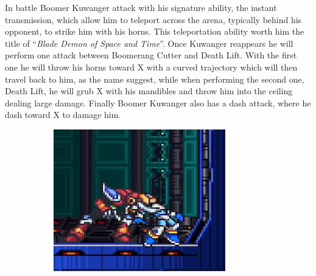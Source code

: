 In battle Boomer Kuwanger attack with his signature ability, the instant transmission, which allow him to teleport across the arena, typically behind his opponent, to strike him with his horns. This teleportation ability worth him the title of  ``\textit{Blade Demon of Space and Time}''\cite{book:MMX_Complete_art}. Once Kuwanger reappears he will perform one attack between Boomerang Cutter and Death Lift. With the first one he will throw his horns toward X with a curved trajectory which will then travel back to him, as the name suggest, while when performing the second one, Death Lift, he will grub X with his mandibles and throw him into the ceiling dealing large damage. Finally Boomer Kuwanger also has a dash attack, where he dash toward X to damage him.
 \begin{figure}[htp]
	\centering
	\begin{subfigure}{0.4\linewidth}
		\centering
		\includegraphics[width=\linewidth]{figures/X1/Boomer_lift_1.jpg}
		\caption{}
	\end{subfigure}
	\begin{subfigure}{0.3\linewidth}
		\centering

\end{subfigure}
\end{figure}
